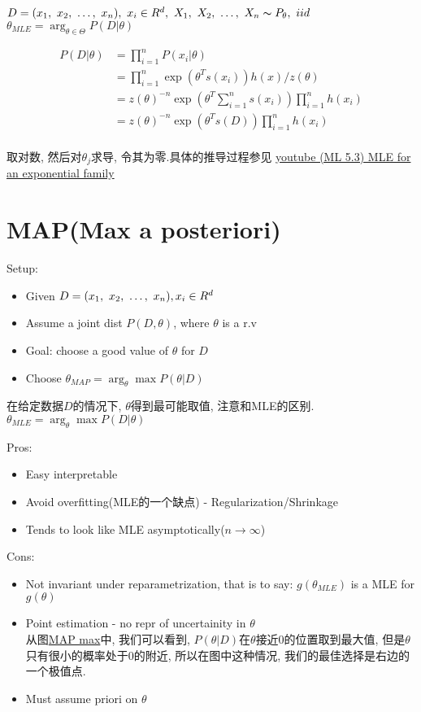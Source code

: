 \documentclass{article}
\begin{document}
$D= (x_1,~x_2,~\ldots,~x_n),\ x_i \in R^d,\ X_1,~X_2,~\ldots,~X_n \thicksim{P}_\theta,\ iid$\\
$\theta_{MLE} = \arg_{\theta \in \Theta} P(D|\theta)$

$$
\begin{aligned}
P(D|\theta)
& = \prod_{i=1}^n P(x_i|\theta) \\
& = \prod_{i=1}^n \exp(\theta^T s(x_i)) h(x)/z(\theta) \\
& = z(\theta)^{-n} \exp(\theta^T \sum_{i=1}^n s(x_i)) \prod_{i=1}^n h(x_i) \\
& = z(\theta)^{-n} \exp(\theta^T s(D)) \prod_{i=1}^n h(x_i) \\
\end{aligned}
$$

取对数, 然后对$\theta_j$求导, 令其为零.具体的推导过程参见
\href{https://www.youtube.com/watch?v=LcbwmT1OAKo&list=PLD0F06AA0D2E8FFBA&index=29}{youtube (ML 5.3) MLE for an exponential family}

\section{MAP(Max a posteriori)}
Setup:
\begin{itemize}
\item Given $D = (x_1,~x_2,~\ldots,~x_n), x_i \in R^d$
\item Assume a joint dist $P(D, \theta)$, where $\theta$ is a r.v
\item Goal: choose a good value of $\theta$ for $D$
\item Choose $\theta_{MAP} = \arg_\theta \max P(\theta | D)$
\end{itemize}
在给定数据$D$的情况下, $\theta$得到最可能取值, 注意和MLE的区别.
$\theta_{MLE} = \arg_\theta \max P(D|\theta)$

Pros:
\begin{itemize}
\item Easy interpretable
\item Avoid overfitting(MLE的一个缺点) - Regularization/Shrinkage
\item Tends to look like MLE asymptotically($n \to \infty$)
\end{itemize}

Cons:
\begin{itemize}
\item Not invariant under reparametrization, that is to say: $g(\theta_{MLE})$ is a MLE for $g(\theta)$
\item Point estimation - no repr of uncertainity in $\theta$\\
	从图\href{http://i.imgbox.com/k292Tu6D.png}{MAP max}中, 我们可以看到, $P(\theta|D)$在$\theta$接近0的位置取到最大值, 但是$\theta$只有很小的概率处于0的附近, 所以在图中这种情况, 我们的最佳选择是右边的一个极值点.
\item Must assume priori on $\theta$
\end{itemize}
\end{document}
